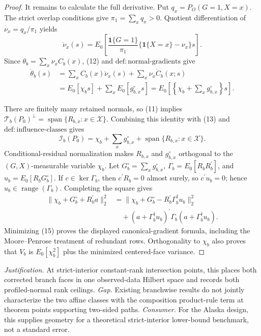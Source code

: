 \documentclass{article}
\begin{document}
\begin{proof}
It remains to calculate the full derivative.  Put \(q_x=P_O(G=1,X=x)\).  The strict overlap conditions give \(\pi_1=\sum_xq_x>0\).  Quotient differentiation of \(\nu_x=q_x/\pi_1\) yields
\[
 \dot\nu_x(s)
 =E_0\!\left[\frac{\mathbf 1\{G=1\}}{\pi_1}
 \{\mathbf 1\{X=x\}-\nu_x\}s\right].
 \tag{12}
\]
Since \(\theta_b=\sum_x\nu_xC_b(x)\), (12) and \(\mathrm{def{:}normal\text{-}gradients}\) give
\[
 \begin{aligned}
 \dot\theta_b(s)
 &=\sum_xC_b(x)\dot\nu_x(s)+\sum_x\nu_x\dot C_b(x;s)\\
 &=E_0[\chi_bs]+\sum_xE_0[g^{\circ}_{b,x}s]
 =E_0\!\left[\left\{\chi_b+\sum_xg^{\circ}_{b,x}\right\}s\right].
 \end{aligned}
 \tag{13}
\]

There are finitely many retained normals, so (11) implies \(\mathcal T_b(P_0)^{\perp}=\operatorname{span}\{R_{b,x}:x\in\mathcal X\}\).  Combining this identity with (13) and \(\mathrm{def{:}influence\text{-}classes}\) gives
\[
 \mathcal I_b(P_0)=\chi_b+\sum_xg^{\circ}_{b,x}
 +\operatorname{span}\{R_{b,x}:x\in\mathcal X\}.
 \tag{14}
\]
Conditional-residual normalization makes \(R_{b,x}\) and \(g^{\circ}_{b,x}\) orthogonal to the \((G,X)\)-measurable variable \(\chi_b\).  Let \(G_b^{\circ}=\sum_xg^{\circ}_{b,x}\), \(\Gamma_b=E_0[R_bR_b^{\prime}]\), and \(u_b=E_0[R_bG_b^{\circ}]\).  If \(c\in\ker\Gamma_b\), then \(c^{\prime}R_b=0\) almost surely, so \(c^{\prime}u_b=0\); hence \(u_b\in\operatorname{range}(\Gamma_b)\).  Completing the square gives
\[
 \begin{aligned}
 \|\chi_b+G_b^{\circ}+R_b^{\prime}a\|_2^2
 &=\|\chi_b+G_b^{\circ}-R_b^{\prime}\Gamma_b^{\dagger}u_b\|_2^2\\
 &\quad +(a+\Gamma_b^{\dagger}u_b)^{\prime}
 \Gamma_b(a+\Gamma_b^{\dagger}u_b).
 \end{aligned}
 \tag{15}
\]
Minimizing (15) proves the displayed canonical-gradient formula, including the Moore--Penrose treatment of redundant rows.  Orthogonality to \(\chi_b\) also proves that \(V_b\) is \(E_0[\chi_b^2]\) plus the minimized centered-face variance.
\end{proof}
\par\smallskip\noindent \textit{Justification.} At strict-interior constant-rank intersection points, this places both corrected branch faces in one observed-data Hilbert space and records both profiled-normal rank ceilings. \textit{Gap.} Existing branchwise results do not jointly characterize the two affine classes with the composition product-rule term at theorem points supporting two-sided paths. \textit{Consumer.} For the Alaska design, this supplies geometry for a theoretical strict-interior lower-bound benchmark, not a standard error.
\end{document}

